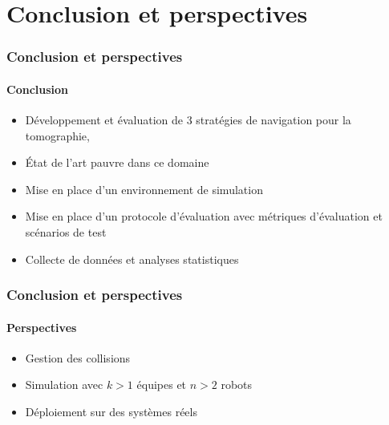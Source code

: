 \documentclass{beamer}
\begin{document}
	\section{Conclusion et perspectives}
		\begin{frame}
			\frametitle{Conclusion et perspectives}
			\framesubtitle{Conclusion}
			\begin{itemize}
				\item Développement et évaluation de 3 stratégies de navigation pour la tomographie,
				\item État de l'art pauvre dans ce domaine
				\item Mise en place d'un environnement de simulation
				\item Mise en place d'un protocole d'évaluation avec métriques d'évaluation et scénarios de test
				\item Collecte de données et analyses statistiques
			\end{itemize}
		\end{frame}
		\begin{frame}
			\frametitle{Conclusion et perspectives}
			\framesubtitle{Perspectives}
			\begin{itemize}
				\item Gestion des collisions
				\item Simulation avec $k > 1$ équipes et $n > 2$ robots
				\item Déploiement sur des systèmes réels
			\end{itemize}
		\end{frame}
\end{document}
